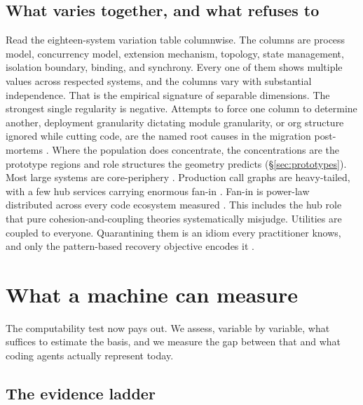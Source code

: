 \documentclass[11pt,oneside]{article}
\theoremstyle{definition}
\begin{document}
\subsection{What varies together, and what refuses to}

Read the eighteen-system variation table columnwise. The columns are process model, concurrency
model, extension mechanism, topology, state management, isolation boundary, binding, and
synchrony. Every one of them shows multiple values across respected systems, and the columns
vary with substantial independence. That is the empirical signature of separable dimensions. The strongest single
regularity is negative. Attempts to force one column to determine another, deployment
granularity dictating module granularity, or org structure ignored while cutting code, are the
named root causes in the migration post-mortems \cite{primevideo2023,shopify2019,uberdoma2020}.
Where the population does concentrate, the concentrations are the prototype regions and role
structures the geometry predicts (\S\ref{sec:prototypes}). Most large systems are
core-periphery \cite{baldwin2014}. Production call graphs are heavy-tailed, with a few hub
services carrying enormous fan-in \cite{luo2021}. Fan-in is power-law distributed across every
code ecosystem measured \cite{louridas2008}. This includes the hub role that pure
cohesion-and-coupling theories systematically misjudge. Utilities are coupled to everyone.
Quarantining them is an idiom every practitioner knows, and only the pattern-based recovery
objective encodes it \cite{tzerpos2000}.

\section{What a machine can measure}\label{sec:agent}

The computability test now pays out. We assess, variable by variable, what suffices to estimate
the basis, and we measure the gap between that and what coding agents actually represent today.

\subsection{The evidence ladder}
\end{document}
